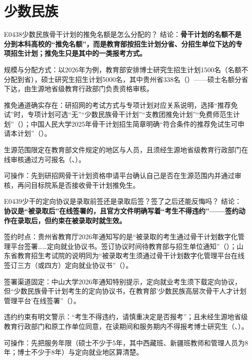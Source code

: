 \section{少数民族}
\begin{qa}{E0438}{少数民族骨干计划的推免名额是怎么分配的？}
结论：\textbf{骨干计划的名额不是分到本科高校的“推免名额”，而是教育部按招生计划分省、分招生单位下达的专项招生计划；推免生只是其中的一类报考方式。}

规模与分配方式：以2026年为例，教育部安排博士研究生招生计划1500名（名额不分配到省），硕士研究生招生计划5000名，其中贵州省338名（）——硕士名额分省下达，由生源地省级教育行政部门负责资格审核。

推免通道确实存在：研招网的考试方式与专项计划对应关系说明，选择“推荐免试”时，专项计划可选“无”“少数民族骨干计划”“支教团推免计划”“免费师范生计划”（）；中国人民大学2025年骨干计划招生简章明确“符合条件的推荐免试生可申请本计划”（）。

生源范围限定在教育部文件规定的地区与人员，且须经生源地省级教育行政部门在线审核通过方可报名（、）。

可操作：先到研招网骨干计划资格申请平台确认自己是否在生源范围内并通过审核，再问目标院系是否接收骨干计划推免生。
\end{qa}

\begin{qa}{E0439}{少干的定向协议是录取前签还是录取后签？签了之后还能反悔吗？}
结论：\textbf{协议是“被录取后”在线签署的，且官方文件明确写着“考生不得违约”——签约动作在录取后，但约束在被录取时就生效。}

签约时点：贵州省教育厅2026年通知写的是“被录取的考生通过骨干计划数字化管理平台签署……定向就业协议书。签订协议时间待教育部与招生单位通知”（）；山东省教育招生考试院的说明同为“被录取考生须通过骨干计划数字化管理平台在线签订三方（或四方）定向就业协议书”（）。

签署渠道固定：中山大学2026年通知特别提示，定向就业考生须下载定向协议，但“少数民族骨干计划考生的定向协议书，在教育部'少数民族高层次骨干人才计划管理平台'在线签署”（）。

违约约束有明文警示：“考生不得违约，请慎重决定是否报考”；且未经生源地省级教育行政部门和原工作单位同意，在读期间和服务期内不得报考博士研究生（、）。

可操作：先把服务年限（硕士不少于5年，其中西藏班、新疆班教师和管理人员为8年；博士不少于8年）与定向就业地区算清楚。
\end{qa}

